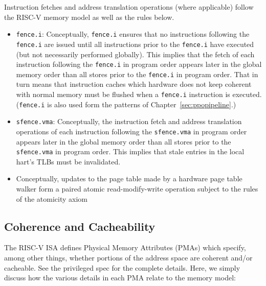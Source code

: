 Instruction fetches and address translation operations (where applicable) follow the RISC-V memory model as well as the rules below.
\begin{itemize}
  \item {\tt fence.i}: Conceptually, {\tt fence.i} ensures that no instructions following the {\tt fence.i} are issued until all instructions prior to the {\tt fence.i} have executed (but not necessarily performed globally).
    This implies that the fetch of each instruction following the {\tt fence.i} in program order appears later in the global memory order than all stores prior to the {\tt fence.i} in program order.
    That in turn means that instruction caches which hardware does not keep coherent with normal memory must be flushed when a {\tt fence.i} instruction is executed.
    ({\tt fence.i} is also used form the patterns of Chapter~\ref{sec:ppopipeline}.)
  \item {\tt sfence.vma}: Conceptually, the instruction fetch and address translation operations of each instruction following the {\tt sfence.vma} in program order appears later in the global memory order than all stores prior to the {\tt sfence.vma} in program order.
    This implies that stale entries in the local hart's TLBs must be invalidated.
  \item Conceptually, updates to the page table made by a hardware page table walker form a paired atomic read-modify-write operation subject to the rules of the atomicity axiom
\end{itemize}

\subsection{Coherence and Cacheability}

The RISC-V ISA defines Physical Memory Attributes (PMAs) which specify, among other things, whether portions of the address space are coherent and/or cacheable.
See the privileged spec for the complete details.
Here, we simply discuss how the various details in each PMA relate to the memory model:

